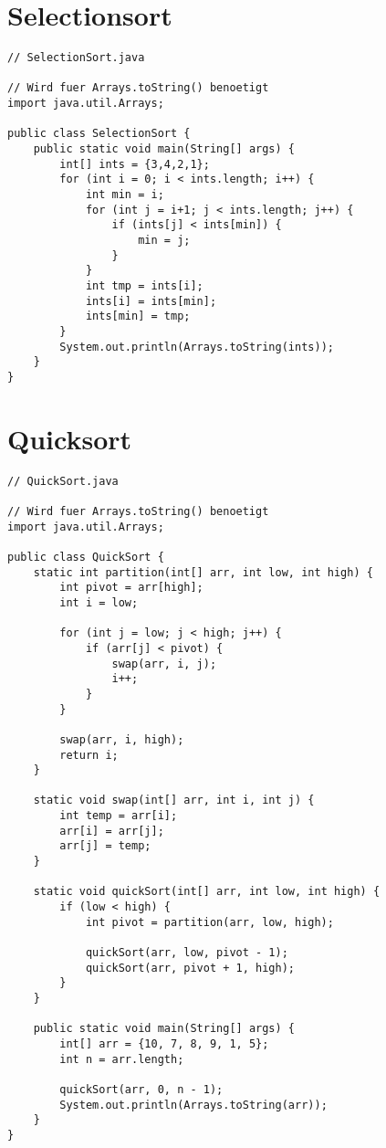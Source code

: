 \section{Selectionsort}
\begin{center}
\begin{lstlisting}
// SelectionSort.java

// Wird fuer Arrays.toString() benoetigt
import java.util.Arrays;

public class SelectionSort {
    public static void main(String[] args) {
        int[] ints = {3,4,2,1};
        for (int i = 0; i < ints.length; i++) {
            int min = i;
            for (int j = i+1; j < ints.length; j++) {
                if (ints[j] < ints[min]) {
                    min = j;
                }
            }
            int tmp = ints[i];
            ints[i] = ints[min];
            ints[min] = tmp;
        }
        System.out.println(Arrays.toString(ints));
    }
}
\end{lstlisting}
\end{center}

\section{Quicksort}
\begin{center}
\begin{lstlisting}
// QuickSort.java

// Wird fuer Arrays.toString() benoetigt
import java.util.Arrays;

public class QuickSort {
    static int partition(int[] arr, int low, int high) {
        int pivot = arr[high];
        int i = low;

        for (int j = low; j < high; j++) {
            if (arr[j] < pivot) {
                swap(arr, i, j);
                i++;
            }
        }

        swap(arr, i, high);  
        return i;
    }

    static void swap(int[] arr, int i, int j) {
        int temp = arr[i];
        arr[i] = arr[j];
        arr[j] = temp;
    }

    static void quickSort(int[] arr, int low, int high) {
        if (low < high) {          
            int pivot = partition(arr, low, high);

            quickSort(arr, low, pivot - 1);
            quickSort(arr, pivot + 1, high);
        }
    }

    public static void main(String[] args) {
        int[] arr = {10, 7, 8, 9, 1, 5};
        int n = arr.length;
      
        quickSort(arr, 0, n - 1);
        System.out.println(Arrays.toString(arr));
    }
}
\end{lstlisting}
\end{center}
